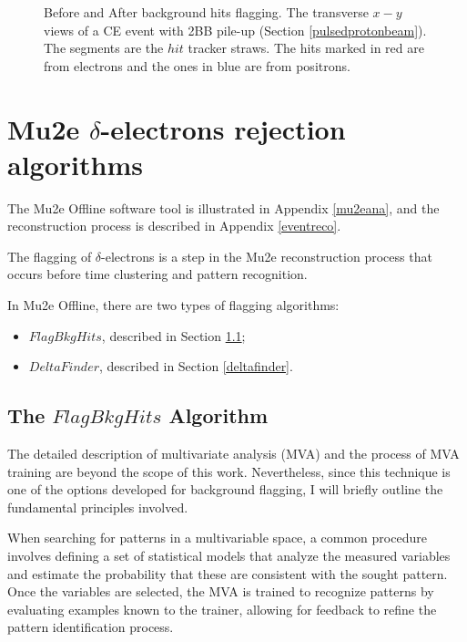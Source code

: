 \begin{figure}[!h]
\begin{subfigure}[b]{0.7\linewidth}
        \label{fig:af}
    \end{subfigure}
    \caption[Before and After background hits flagging.]{Before and After background hits flagging. The transverse $x-y$ views of a CE 
    event with 2BB pile-up (Section \ref{pulsedprotonbeam}). The segments are the $hit$ tracker straws. The hits marked in
    red are from electrons and the ones in blue are from positrons.}
    \label{fig:afbef} 
\end{figure}






\section{Mu2e $\delta$-electrons rejection algorithms}
The Mu2e Offline software tool is illustrated in 
Appendix \ref{mu2eana}, and the reconstruction 
process is described in Appendix \ref{eventreco}. 

The flagging of $\delta$-electrons is a step in the 
Mu2e reconstruction process that occurs before time clustering and pattern recognition.

In Mu2e Offline, there are two types of flagging algorithms:
\begin{itemize}
    \item $FlagBkgHits$, described in Section \ref{flagbkghits};
    \item $DeltaFinder$, described in Section \ref{deltafinder}.
\end{itemize}

\subsection{The $FlagBkgHits$ Algorithm}\label{flagbkghits}
The detailed description of multivariate analysis (MVA) and the 
process of MVA training are beyond the scope of this work. 
Nevertheless, since this technique is one of the options 
developed for background flagging, I will briefly outline 
the fundamental principles involved.

When searching for patterns in a multivariable space, 
a common procedure involves defining a set of statistical 
models that analyze the measured variables and estimate 
the probability that these are consistent with the 
sought pattern. Once the variables are selected, 
the MVA is trained to recognize patterns by 
evaluating examples known to the trainer, 
allowing for feedback to refine the 
pattern identification process.

